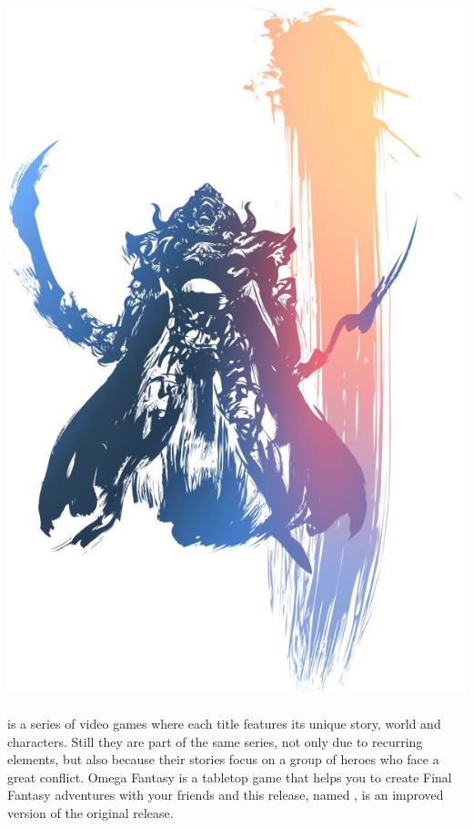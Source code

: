 %
\\\\
%
\includegraphics[width=\columnwidth]{./art/images/ff12.jpg} \\\\
%
 is a series of video games where each title features its unique story, world and characters.
Still they are part of the same series, not only due to recurring elements, but also because their stories focus on a group of heroes who face a great conflict.
Omega Fantasy is a tabletop game that helps you to create Final Fantasy adventures with your friends and this release, named , is an improved version of the original release.
